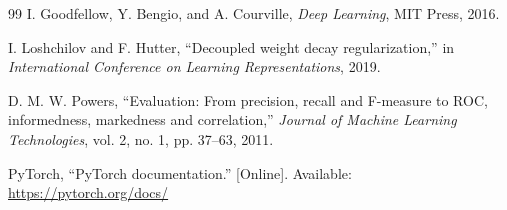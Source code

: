 \documentclass[12pt,twoside,openright]{report}
\begin{document}
\begin{thebibliography}{99}
I. Goodfellow, Y. Bengio, and A. Courville, \textit{Deep Learning},
MIT Press, 2016.

I. Loshchilov and F. Hutter, ``Decoupled weight decay regularization,'' in
\textit{International Conference on Learning Representations}, 2019.

D. M. W. Powers, ``Evaluation: From precision, recall and F-measure to ROC,
informedness, markedness and correlation,'' \textit{Journal of Machine
Learning Technologies}, vol. 2, no. 1, pp. 37--63, 2011.

PyTorch, ``PyTorch documentation.'' [Online]. Available:
\url{https://pytorch.org/docs/}

\end{thebibliography}
\end{document}
